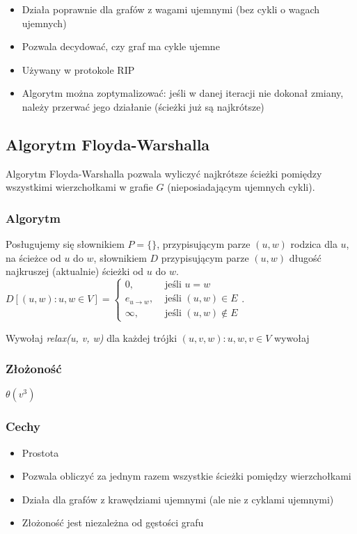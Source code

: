 \documentclass[main.tex]{subfiles}
\begin{document}
    \begin{itemize}
        \item Działa poprawnie dla grafów z wagami ujemnymi (bez cykli o wagach ujemnych)
        \item Pozwala decydować, czy graf ma cykle ujemne
        \item Używany w protokole RIP
        \item Algorytm można zoptymalizować: jeśli w danej iteracji nie dokonał zmiany,
        należy przerwać jego działanie (ścieżki już są najkrótsze)
    \end{itemize}

    \subsection{Algorytm Floyda-Warshalla}

    Algorytm Floyda-Warshalla pozwala wyliczyć najkrótsze ścieżki pomiędzy wszystkimi
    wierzchołkami w grafie $G$ (nieposiadającym ujemnych cykli).

    \subsubsection{Algorytm}

    Posługujemy się słownikiem $P = \{\}$, przypisującym parze $(u, w)$ rodzica dla $u$,
    na ścieżce od $u$ do $w$, słownikiem $D$ przypisującym parze $(u, w)$ długość
    najkruszej (aktualnie) ścieżki od $u$ do $w$.\\
    $D[(u, w) : u, w \in V] =
    \begin{cases}
        0, &\text{ jeśli } u = w\\
        e_{u \rightarrow w}, &\text{ jeśli } (u, w) \in E\\
        \infty, &\text{ jeśli } (u, w) \notin E
    \end{cases}$.
    \[\]

    Wywołaj  \textit{relax(u, v, w)} dla każdej trójki $(u, v, w) : u, w, v \in V$ wywołaj
    \subsubsection{Złożoność}
    $\theta(v^3)$

    \subsubsection{Cechy}
    \begin{itemize}
        \item Prostota
        \item Pozwala obliczyć za jednym razem wszystkie ścieżki pomiędzy wierzchołkami
        \item Działa dla grafów z krawędziami ujemnymi (ale nie z cyklami ujemnymi)
        \item Złożoność jest niezależna od gęstości grafu
    \end{itemize}
\end{document}
